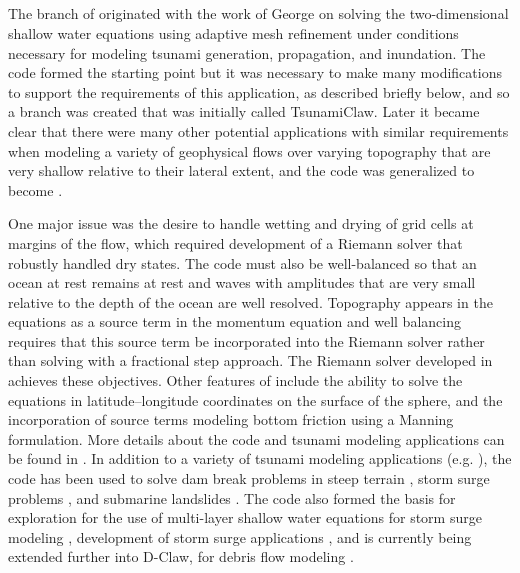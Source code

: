 %
%
%

\subsection{\geoclaw} 

The \geoclaw branch of \clawpack originated with the work of George
\cite{dgeorge:masters, dgeorge:phd, dgeorge:jcp} 
on solving the
two-dimensional shallow water equations using adaptive mesh refinement under
conditions necessary for modeling tsunami generation, propagation, and
inundation.
The \amrclaw code formed the starting point but it was necessary to make many 
modifications to support the requirements of this application, as described
briefly below, and so a branch was created that was initially called
TsunamiClaw.  Later it became clear that there were many other potential
applications with similar requirements when modeling a variety of
geophysical flows over varying topography that are very shallow 
relative to their lateral extent,
and the code was generalized to become \geoclaw.  

One major issue was the desire to handle wetting and drying of grid cells at
margins of the flow, which required development of a Riemann solver that
robustly handled dry states.  The code must also be well-balanced so that an
ocean at rest remains at rest and waves with amplitudes that are very small
relative to the depth of the ocean are well resolved.  Topography appears in
the equations as a source term in the momentum equation and well balancing
requires that this source term be incorporated into the Riemann solver
rather than solving with a fractional step approach.  The Riemann solver
developed in \cite{dgeorge:phd, dgeorge:jcp} achieves these objectives.
Other features of \geoclaw include the ability to solve the equations in
latitude--longitude coordinates on the surface of the sphere, and the
incorporation of source terms modeling bottom friction using a Manning
formulation.
More details about the code and tsunami modeling applications can be found
in \cite{BergerGeorgeLeVequeMandli:awr11, LeVequeGeorgeBerger:an11}. 
In addition to a variety of tsunami modeling applications (e.g. \cite{??}),
the \geoclaw code has been used to solve dam break problems in steep terrain
\cite{George:Malpasset}, storm surge problems \cite{Mandli:ws},
and submarine landslides \cite{??}.  The code also
formed the basis for exploration for the use of 
multi-layer shallow water equations for storm surge modeling
\cite{mandli:phd}, development of storm surge applications \cite{Mandli:ws},
and is currently being extended further into D-Claw, for debris flow modeling 
\cite{Iverson:2014dc,George:2014gh}.


